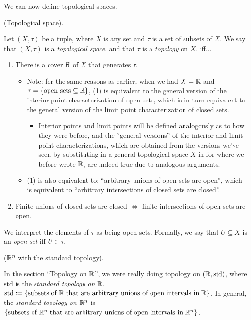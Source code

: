 We can now define topological spaces.

\begin{defn}
    (Topological space).
    
    Let $(X, \tau)$ be a tuple, where $X$ is any set and $\tau$ is a set of subsets of $X$. We say that $(X, \tau)$ is a \textit{topological space}, and that $\tau$ is a \textit{topology} on $X$, iff...

    \begin{enumerate}
        \item There is a cover $\mathcal{B}$ of $X$ that generates $\tau$.
        \begin{itemize}
            \item Note: for the same reasons as earlier, when we had $X = \mathbb{R}$ and $\tau = \{\text{open sets} \subseteq \mathbb{R}\}$, (1) is equivalent to the general version of the interior point characterization of open sets, which is in turn equivalent to the general version of the limit point characterization of closed sets.
            \begin{itemize}
                \item Interior points and limit points will be defined analogously as to how they were before, and the ``general versions'' of the interior and limit point characterizations, which are obtained from the versions we've seen by substituting in a general topological space $X$ in for where we before wrote $\mathbb{R}$, are indeed true due to analogous arguments. 
            \end{itemize}
            \item (1) is also equivalent to: ``arbitrary unions of open sets are open'', which is equivalent to ``arbitrary intersections of closed sets are closed''.
        \end{itemize}
        \item Finite unions of closed sets are closed $\iff$ finite intersections of open sets are open.
    \end{enumerate}

    We interpret the elements of $\tau$ as being open sets. Formally, we say that $U \subseteq X$ is an \textit{open set} iff $U \in \tau$.
\end{defn}

\begin{remark}
     ($\mathbb{R}^n$ with the standard topology).
     
     In the section ``Topology on $\mathbb{R}$'', we were really doing topology on $(\mathbb{R}, \text{std})$, where $\text{std}$ is the \textit{standard topology on $\mathbb{R}$}, $\text{std} := \{ \text{subsets of $\mathbb{R}$ that are arbitrary unions of open intervals in $\mathbb{R}$} \}$. In general, the \textit{standard topology on $\mathbb{R}^n$} is 
     $\{ \text{subsets of $\mathbb{R}^n$ that are arbitrary unions of open intervals in $\mathbb{R}^n$} \}$.
\end{remark}

